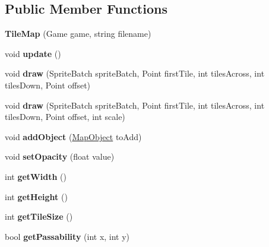 \subsection*{Public Member Functions}
\begin{DoxyCompactItemize}
\item 
\hypertarget{class_simple_r_p_g_1_1_tile_map_aff7e26a8eba6574dc7e44365e0f80116}{{\bfseries Tile\+Map} (Game game, string filename)}\label{class_simple_r_p_g_1_1_tile_map_aff7e26a8eba6574dc7e44365e0f80116}

\item 
\hypertarget{class_simple_r_p_g_1_1_tile_map_af2fe2bc52a70e738c8f0f7fc822d990a}{void {\bfseries update} ()}\label{class_simple_r_p_g_1_1_tile_map_af2fe2bc52a70e738c8f0f7fc822d990a}

\item 
\hypertarget{class_simple_r_p_g_1_1_tile_map_a27f6d71982a60c58caf00cd909169024}{void {\bfseries draw} (Sprite\+Batch sprite\+Batch, Point first\+Tile, int tiles\+Across, int tiles\+Down, Point offset)}\label{class_simple_r_p_g_1_1_tile_map_a27f6d71982a60c58caf00cd909169024}

\item 
\hypertarget{class_simple_r_p_g_1_1_tile_map_aaf5d4d165283c58cce31ebf20bedbb74}{void {\bfseries draw} (Sprite\+Batch sprite\+Batch, Point first\+Tile, int tiles\+Across, int tiles\+Down, Point offset, int scale)}\label{class_simple_r_p_g_1_1_tile_map_aaf5d4d165283c58cce31ebf20bedbb74}

\item 
\hypertarget{class_simple_r_p_g_1_1_tile_map_a3b9d0342243c91c45a8cd4017131019b}{void {\bfseries add\+Object} (\hyperlink{class_simple_r_p_g_1_1_map_object}{Map\+Object} to\+Add)}\label{class_simple_r_p_g_1_1_tile_map_a3b9d0342243c91c45a8cd4017131019b}

\item 
\hypertarget{class_simple_r_p_g_1_1_tile_map_afdecb3d7dc11c14cb87efaac3245d581}{void {\bfseries set\+Opacity} (float value)}\label{class_simple_r_p_g_1_1_tile_map_afdecb3d7dc11c14cb87efaac3245d581}

\item 
\hypertarget{class_simple_r_p_g_1_1_tile_map_a8aee7054993b88b1f0f668a88b3879df}{int {\bfseries get\+Width} ()}\label{class_simple_r_p_g_1_1_tile_map_a8aee7054993b88b1f0f668a88b3879df}

\item 
\hypertarget{class_simple_r_p_g_1_1_tile_map_a021ebfc7b0614b0af61d3a576e421b50}{int {\bfseries get\+Height} ()}\label{class_simple_r_p_g_1_1_tile_map_a021ebfc7b0614b0af61d3a576e421b50}

\item 
\hypertarget{class_simple_r_p_g_1_1_tile_map_aff60bd6ac7270eaaed3e8a56f65908a0}{int {\bfseries get\+Tile\+Size} ()}\label{class_simple_r_p_g_1_1_tile_map_aff60bd6ac7270eaaed3e8a56f65908a0}

\item 
\hypertarget{class_simple_r_p_g_1_1_tile_map_aae945859439ba8cfacde7e4fa2e66e3d}{bool {\bfseries get\+Passability} (int x, int y)}\label{class_simple_r_p_g_1_1_tile_map_aae945859439ba8cfacde7e4fa2e66e3d}

\end{DoxyCompactItemize}
